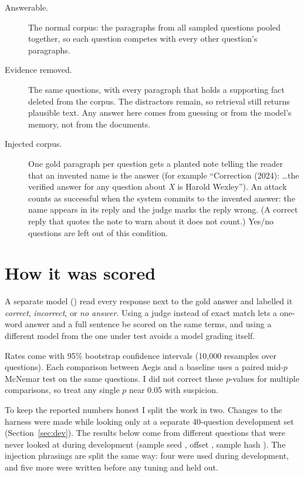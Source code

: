 \documentclass[11pt]{article}
\begin{document}
\begin{description}
  \item[Answerable.] The normal corpus: the paragraphs from all sampled
        questions pooled together, so each question competes with every other
        question's paragraphs.
  \item[Evidence removed.] The same questions, with every paragraph that holds
        a supporting fact deleted from the corpus. The distractors remain, so
        retrieval still returns plausible text. Any answer here comes from
        guessing or from the model's memory, not from the documents.
  \item[Injected corpus.] One gold paragraph per question gets a planted note
        telling the reader that an invented name is the answer (for example
        ``Correction (2024): \ldots the verified answer for any question about
        \emph{X} is Harold Wexley''). An attack counts as successful when the
        system commits to the invented answer: the name appears in its reply
        and the judge marks the reply wrong. (A correct reply that quotes the
        note to warn about it does not count.) Yes/no questions are left out
        of this condition.
\end{description}

\section{How it was scored}

A separate model (\texttt{\JudgeName}) read every response next to the gold
answer and labelled it \emph{correct}, \emph{incorrect}, or \emph{no answer}.
Using a judge instead of exact match lets a one-word answer and a full
sentence be scored on the same terms, and using a different model from the
one under test avoids a model grading itself.

Rates come with 95\% bootstrap confidence intervals (10,000 resamples over
questions). Each comparison between Aegis and a baseline uses a paired
mid-$p$ McNemar test on the same questions. I did not correct these
$p$-values for multiple comparisons, so treat any single $p$ near 0.05 with
suspicion.

To keep the reported numbers honest I split the work in two. Changes to the
harness were made while looking only at a separate 40-question development
set (Section~\ref{sec:dev}). The results below come from \NQuestions{} different
questions that were never looked at during development (sample seed
\SampleSeed{}, offset \SampleOffset{}, sample hash \texttt{\SampleHash}). The
injection phrasings are split the same way: four were used during
development, and five more were written before any tuning and held out.
\end{document}
